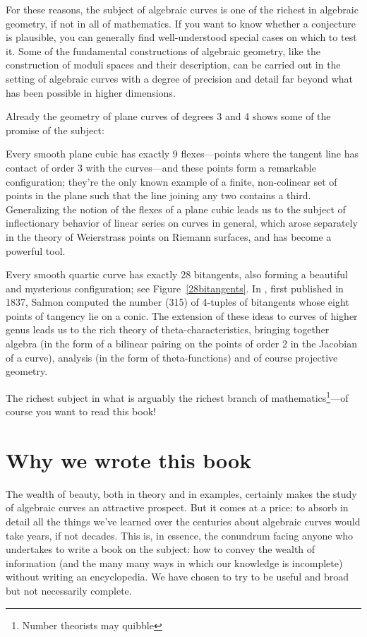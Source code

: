 For these reasons, the subject of algebraic curves is one of the richest in algebraic geometry, if not in all of mathematics. If you want to know whether a conjecture is plausible, you can generally find well-understood special cases on which to test it. Some of the fundamental constructions of algebraic geometry, like the construction of moduli spaces and their description, can be carried out in the setting of algebraic curves with a degree of precision and detail far beyond what has been possible in higher dimensions. 

Already the geometry of plane curves of degrees 3 and 4 shows some of the promise of the subject:

Every smooth plane cubic has exactly 9 flexes---points where the tangent line has contact of order 3 with the curves---and these points form a remarkable configuration; they're the only known example of a finite, non-colinear set of points in the plane such that the line joining any two contains a third. Generalizing the notion of the flexes of a plane cubic leads us to the subject of inflectionary behavior of linear series on curves in general, which arose separately in the theory of Weierstrass points on Riemann surfaces, and  has become a powerful tool. 

Every smooth quartic curve has exactly 28 bitangents, also forming a beautiful and mysterious configuration; see
Figure~\ref{28bitangents}. In \cite{MR0115124}, first published in 1837, Salmon computed the number (315) of 4-tuples of bitangents whose eight points of tangency lie on a conic. The extension of these ideas to curves of higher genus leads us to the rich theory of theta-characteristics, bringing together algebra (in the form of a bilinear pairing on the points of order 2 in the Jacobian of a curve), analysis (in the form of theta-functions) and of course projective geometry.

The richest subject in what is arguably the richest branch of mathematics\footnote{Number theorists may quibble}---of course you want to read this book! 

\section{Why we wrote this book}

The wealth of beauty, both in theory and in examples, certainly makes the study of algebraic curves an attractive prospect. But it comes at a price: to absorb in detail all the things we've learned over the centuries about algebraic curves would take years, if not decades. This is, in essence, the conundrum facing anyone who undertakes to write a book on the subject: how to convey the wealth of information  (and the many many ways in which our knowledge is incomplete) without writing an encyclopedia. We have chosen to try to be useful and broad but not necessarily complete. 

